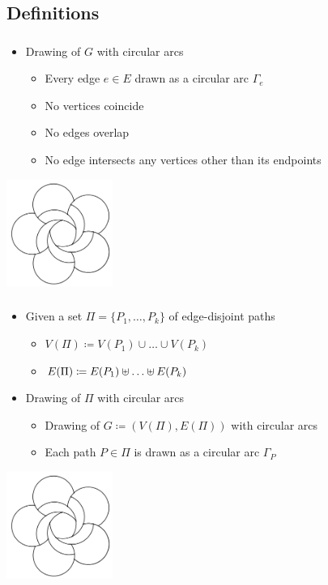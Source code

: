 \subsection{Definitions}
\label{subsect:application-definitions}

\begin{frame}
  \frametitle{\insertsubsection}
  \begin{itemize}
    \item Drawing of ${G}$ with circular arcs \begin{itemize}
      \item Every edge ${e \in E}$ drawn as a circular arc ${\Gamma_e}$
      \item No vertices coincide
      \item No edges overlap
      \item No edge intersects any vertices other than its endpoints
    \end{itemize}
  \end{itemize}
  \centering
  \includegraphics[height=3.5cm,natwidth=620,natheight=626]{Resources/Schulz.png}
\end{frame}

\begin{frame}
  \frametitle{\insertsubsection}
  \begin{itemize}
    \item Given a set ${\Pi = \lbrace P_1, \ldots, P_k \rbrace}$ of edge-disjoint paths \begin{itemize}
      \item ${V(\Pi) \coloneqq V(P_1) \cup \ldots \cup V(P_k)}$
      \item ${E(\Pi) \coloneqq E(P_1) \uplus \ldots \uplus E(P_k)}$
    \end{itemize}
    \item Drawing of ${\Pi}$ with circular arcs \begin{itemize}
      \item Drawing of ${G \coloneqq (V(\Pi), E(\Pi))}$ with circular arcs
      \item Each path ${P \in \Pi}$ is drawn as a circular arc ${\Gamma_P}$
    \end{itemize}
  \end{itemize}
  \centering
  \includegraphics[height=3.5cm,natwidth=620,natheight=626]{Resources/Schulz.png}
\end{frame}
